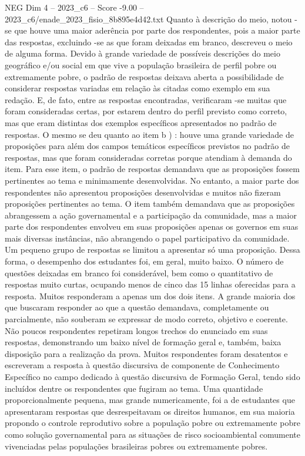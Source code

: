 \begin{textsample}{NEG Dim 4 – 2023\_c6 – Score -9.00 – 2023\_c6/enade\_2023\_fisio\_8b895e4d42.txt}
Quanto à descrição do meio, notou -se que houve uma maior aderência por parte dos respondentes, pois a maior parte das respostas, excluindo -se as que foram deixadas em branco, descreveu o meio de alguma forma.
Devido à grande variedade de possíveis descrições do meio geográfico e/ou social em que vive a população brasileira de perfil pobre ou extremamente pobre, o padrão de respostas deixava aberta a possibilidade de considerar respostas variadas em relação às citadas como exemplo em sua redação.
E, de fato, entre as respostas encontradas, verificaram -se muitas que foram consideradas certas, por estarem dentro do perfil previsto como correto, mas que eram distintas dos exemplos específicos apresentados no padrão de respostas.
O mesmo se deu quanto ao item b ) : houve uma grande variedade de proposições para além dos campos temáticos específicos previstos no padrão de respostas, mas que foram consideradas corretas porque atendiam à demanda do item.
Para esse item, o padrão de respostas demandava que as proposições fossem pertinentes ao tema e minimamente desenvolvidas.
No entanto, a maior parte dos respondentes não apresentou proposições desenvolvidas e muitos não fizeram proposições pertinentes ao tema.
O item também demandava que as proposições abrangessem a ação governamental e a participação da comunidade, mas a maior parte dos respondentes envolveu em suas proposições apenas os governos em suas mais diversas instâncias, não abrangendo o papel participativo da comunidade.
Um pequeno grupo de respostas se limitou a apresentar só uma proposição.
Dessa forma, o desempenho dos estudantes foi, em geral, muito baixo.
O número de questões deixadas em branco foi considerável, bem como o quantitativo de respostas muito curtas, ocupando menos de cinco das 15 linhas oferecidas para a resposta.
Muitos responderam a apenas um dos dois itens.
A grande maioria dos que buscaram responder ao que a questão demandava, completamente ou parcialmente, não souberam se expressar de modo correto, objetivo e coerente.
Não poucos respondentes repetiram longos trechos do enunciado em suas respostas, demonstrando um baixo nível de formação geral e, também, baixa disposição para a realização da prova.
Muitos respondentes foram desatentos e escreveram a resposta à questão discursiva de componente de Conhecimento Específico no campo dedicado à questão discursiva de Formação Geral, tendo sido incluídos dentre os respondentes que fugiram ao tema.
Uma quantidade proporcionalmente pequena, mas grande numericamente, foi a de estudantes que apresentaram respostas que desrespeitavam os direitos humanos, em sua maioria propondo o controle reprodutivo sobre a população pobre ou extremamente pobre como solução governamental para as situações de risco socioambiental comumente vivenciadas pelas populações brasileiras pobres ou extremamente pobres.

\end{textsample}
